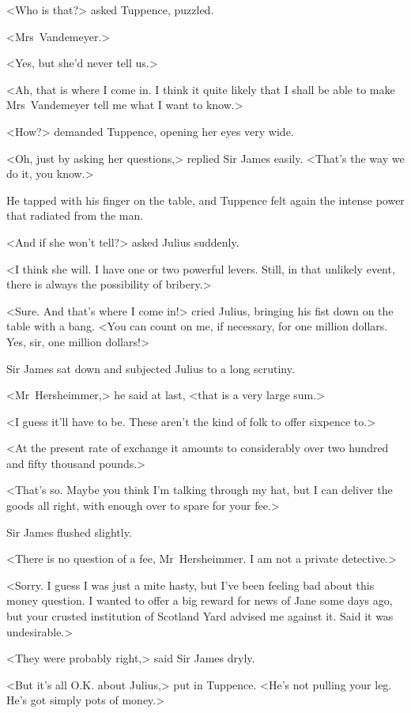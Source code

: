<Who is that?> asked Tuppence, puzzled.

<Mrs~Vandemeyer.>

<Yes, but she'd never tell us.>

<Ah, that is where I come in. I think it quite likely that I shall be able to make Mrs~Vandemeyer tell me what I want to know.>

<How?> demanded Tuppence, opening her eyes very wide.

<Oh, just by asking her questions,> replied Sir James easily. <That's the way we do it, you know.>

He tapped with his finger on the table, and Tuppence felt again the intense power that radiated from the man.

<And if she won't tell?> asked Julius suddenly.

<I think she will. I have one or two powerful levers. Still, in that unlikely event, there is always the possibility of bribery.>

<Sure. And that's where I come in!> cried Julius, bringing his fist down on the table with a bang. <You can count on me, if necessary, for one million dollars. Yes, sir, one million dollars!>

Sir James sat down and subjected Julius to a long scrutiny.

<Mr~Hersheimmer,> he said at last, <that is a very large sum.>

<I guess it'll have to be. These aren't the kind of folk to offer sixpence to.>

<At the present rate of exchange it amounts to considerably over two hundred and fifty thousand pounds.>

<That's so. Maybe you think I'm talking through my hat, but I can deliver the goods all right, with enough over to spare for your fee.>

Sir James flushed slightly.

<There is no question of a fee, Mr~Hersheimmer. I am not a private detective.>

<Sorry. I guess I was just a mite hasty, but I've been feeling bad about this money question. I wanted to offer a big reward for news of Jane some days ago, but your crusted institution of Scotland Yard advised me against it. Said it was undesirable.>

<They were probably right,> said Sir James dryly.

<But it's all O.K. about Julius,> put in Tuppence. <He's not pulling your leg. He's got simply pots of money.>

